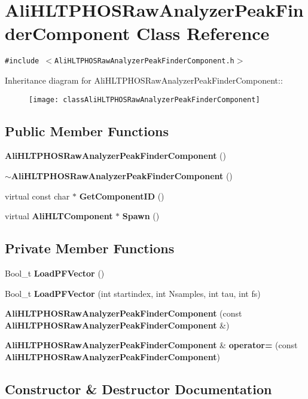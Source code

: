 \section{Ali\-HLTPHOSRaw\-Analyzer\-Peak\-Finder\-Component Class Reference}
\label{classAliHLTPHOSRawAnalyzerPeakFinderComponent}
{\tt \#include $<$Ali\-HLTPHOSRaw\-Analyzer\-Peak\-Finder\-Component.h$>$}

Inheritance diagram for Ali\-HLTPHOSRaw\-Analyzer\-Peak\-Finder\-Component::\begin{figure}[H]
\begin{center}
\leavevmode
\texttt{[image: classAliHLTPHOSRawAnalyzerPeakFinderComponent]}
\end{center}
\end{figure}
\subsection*{Public Member Functions}
\begin{CompactItemize}
\item 
{\bf Ali\-HLTPHOSRaw\-Analyzer\-Peak\-Finder\-Component} ()
\item 
{\bf $\sim$Ali\-HLTPHOSRaw\-Analyzer\-Peak\-Finder\-Component} ()
\item 
virtual const char $\ast$ {\bf Get\-Component\-ID} ()
\item 
virtual {\bf Ali\-HLTComponent} $\ast$ {\bf Spawn} ()
\end{CompactItemize}
\subsection*{Private Member Functions}
\begin{CompactItemize}
\item 
Bool\_\-t {\bf Load\-PFVector} ()
\item 
Bool\_\-t {\bf Load\-PFVector} (int startindex, int Nsamples, int tau, int fs)
\item 
{\bf Ali\-HLTPHOSRaw\-Analyzer\-Peak\-Finder\-Component} (const {\bf Ali\-HLTPHOSRaw\-Analyzer\-Peak\-Finder\-Component} \&)
\item 
{\bf Ali\-HLTPHOSRaw\-Analyzer\-Peak\-Finder\-Component} \& {\bf operator=} (const {\bf Ali\-HLTPHOSRaw\-Analyzer\-Peak\-Finder\-Component})
\end{CompactItemize}


\subsection{Constructor \& Destructor Documentation}
